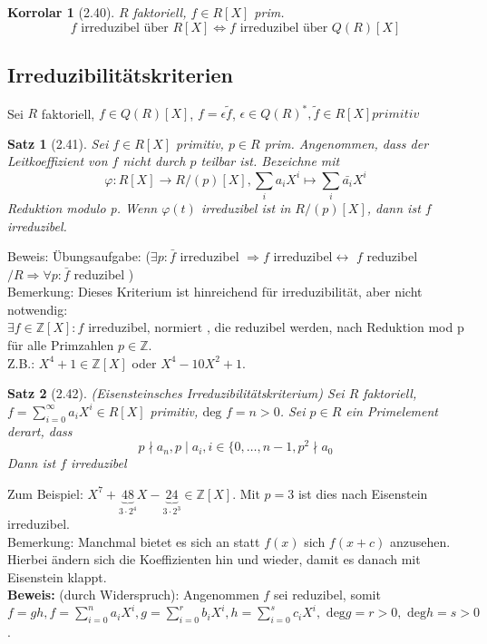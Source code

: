 \documentclass[10pt,a4paper]{article}
\newtheorem{satz}{Satz}
\newtheorem{korr}{Korrolar}
\begin{document}
\begin{korr}[2.40]
$R$ faktoriell, $f \in R[X]$ prim.\\
$$f \textrm{ irreduzibel über }R[X] \Leftrightarrow f \textrm{ irreduzibel über } Q(R)[X]$$
\end{korr}

\subsection{Irreduzibilitätskriterien}
Sei $R$ faktoriell, $f \in Q(R)[X]$, $f = \epsilon \tilde f$, $\epsilon \in Q(R)^*, \tilde f \in R[X] primitiv$
\begin{satz}[2.41]
Sei $f \in R[X]$ primitiv, $p \in R$ prim. Angenommen, dass der Leitkoeffizient von $f$ nicht durch $p$ teilbar ist. Bezeichne mit
$$\varphi: R[X] \rightarrow R/(p)[X], \sum_i a_i X^i \mapsto \sum_i \bar{a_i} X^i$$
\glqq Reduktion modulo p\grqq . Wenn $\varphi(t)$ irreduzibel ist in $R/(p)[X]$, dann ist $f$ irreduzibel.
\end{satz}
Beweis: Übungsaufgabe: (\glqq $\exists p : \bar{f}$ irreduzibel $\Rightarrow f$ irreduzibel\grqq $\leftrightarrow$ \glqq $f$ reduzibel$/R \Rightarrow \forall p : \bar{f}$ reduzibel \grqq )\\
Bemerkung: Dieses Kriterium ist hinreichend für irreduzibilität, aber nicht notwendig:\\
$\exists f \in \mathbb{Z}[X] : f\textrm{ irreduzibel, normiert }$, die reduzibel werden, nach Reduktion mod p für alle Primzahlen $p \in \mathbb{Z}$.\\
Z.B.: $X^4 + 1 \in \mathbb{Z}[X]$ oder $X^4 - 10X^2 + 1$.
\begin{satz}[2.42] (Eisensteinsches Irreduzibilitätskriterium)
Sei $R$ faktoriell, $f = \sum_{i=0}^\infty a_i X^i \in R[X]$ primitiv, $\textrm{deg }f = n > 0$. Sei $p \in R$ ein Primelement derart, dass
$$p \nmid a_n, p \mid a_i, i \in \lbrace {0,\dots,n-1}, p^2 \nmid a_0$$
Dann ist $f$ irreduzibel
\end{satz}
Zum Beispiel: $X^7 + \underbrace{48}_{3 \cdot 2^4} X - \underbrace{24}_{3 \cdot 2^3} \in \mathbb{Z}[X]$. Mit $p = 3$ ist dies nach Eisenstein irreduzibel.\\
Bemerkung: Manchmal bietet es sich an statt $f(x)$ sich $f(x+c)$ anzusehen. Hierbei ändern sich die Koeffizienten hin und wieder, damit es danach mit Eisenstein klappt.\\
\textbf{Beweis:} (durch Widerspruch):
Angenommen $f$ sei reduzibel, somit $f = g h, f = \sum_{i=0}^n a_i X^i, g=\sum_{i = 0}^r b_i X^i, h = \sum_{i=0}^s c_i X^i, \textrm{ deg} g = r > 0, \textrm{ deg} h = s > 0$.\\
\end{document}
